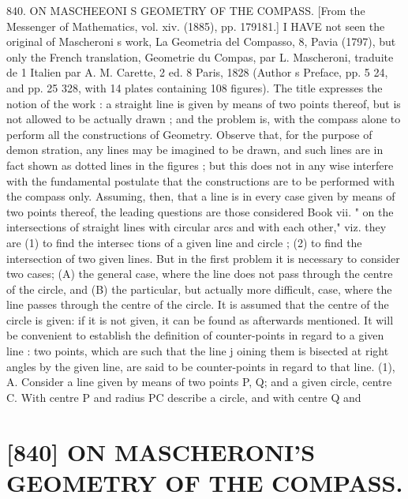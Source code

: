 \documentclass[11pt,a4paper]{book}
\begin{document}
840. ON MASCHEEONI S GEOMETRY OF THE COMPASS. [From the Messenger of Mathematics, vol. xiv. (1885), pp. 179181.] I HAVE not seen the original of Mascheroni s work, La Geometria del Compasso, 8, Pavia (1797), but only the French translation, Geometrie du Compas, par L. Mascheroni, traduite de 1 Italien par A. M. Carette, 2 ed. 8 Paris, 1828 (Author s Preface, pp. 5 24, and pp. 25 328, with 14 plates containing 108 figures). The title expresses the notion of the work : a straight line is given by means of two points thereof, but is not allowed to be actually drawn ; and the problem is, with the compass alone to perform all the constructions of Geometry. Observe that, for the purpose of demon stration, any lines may be imagined to be drawn, and such lines are in fact shown as dotted lines in the figures ; but this does not in any wise interfere with the fundamental postulate that the constructions are to be performed with the compass only. Assuming, then, that a line is in every case given by means of two points thereof, the leading questions are those considered Book vii. " on the intersections of straight lines with circular arcs and with each other," viz. they are (1) to find the intersec tions of a given line and circle ; (2) to find the intersection of two given lines. But in the first problem it is necessary to consider two cases; (A) the general case, where the line does not pass through the centre of the circle, and (B) the particular, but actually more difficult, case, where the line passes through the centre of the circle. It is assumed that the centre of the circle is given: if it is not given, it can be found as afterwards mentioned. It will be convenient to establish the definition of counter-points in regard to a given line : two points, which are such that the line j oining them is bisected at right angles by the given line, are said to be counter-points in regard to that line. (1), A. Consider a line given by means of two points P, Q; and a given circle, centre C. With centre P and radius PC describe a circle, and with centre Q and

\vspace{1em}

\section*{[840] ON MASCHERONI'S GEOMETRY OF THE COMPASS.}

\end{document}
